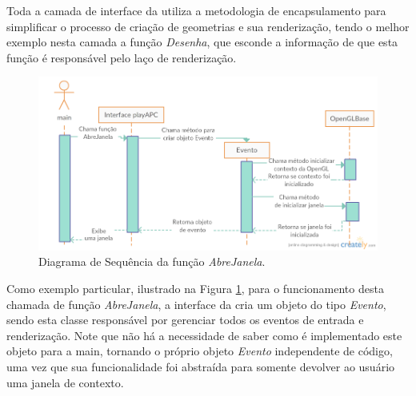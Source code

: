 Toda a camada de interface da \playAPC{} utiliza a metodologia de encapsulamento para simplificar o processo de criação de geometrias e sua renderização, tendo o melhor exemplo nesta camada a função \emph{Desenha}, que esconde a informação de que esta função é responsável pelo laço de renderização.

\begin{figure}[h!]
  \begin{center}
    \includegraphics[width=1.0\textwidth]{img/Sequencia_playcb}
  \end{center}
  \caption{Diagrama de Sequência da função \emph{AbreJanela}.}
  \label{fig:sequencia}
\end{figure}

Como exemplo particular, ilustrado na Figura \ref{fig:sequencia}, para o funcionamento desta chamada de função \emph{AbreJanela}, a interface da \playAPC{} cria um objeto do tipo \emph{Evento}, sendo esta classe responsável por gerenciar todos os eventos de entrada e renderização. Note que não há a necessidade de saber como é implementado este objeto para a main, tornando o próprio objeto \emph{Evento} independente de código, uma vez que sua funcionalidade foi abstraída para somente devolver ao usuário uma janela de contexto.


